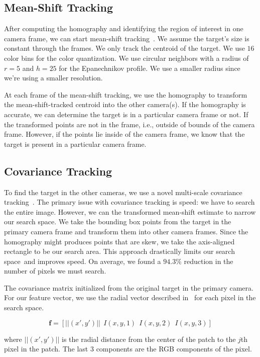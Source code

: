 \documentclass{article}
\begin{document}
\subsection{Mean-Shift Tracking}
\label{sec:meanshift}
After computing the homography and identifying the region of interest in one camera frame, we can start mean-shift tracking~\cite{comaniciu2003kernel}. We assume the target's size is constant through the frames. We only track the centroid of the target. We use $16$ color bins for the color quantization. We use circular neighbors with a radius of $r=5$ and $h=25$ for the Epanechnikov profile. We use a smaller radius since we're using a smaller resolution.

At each frame of the mean-shift tracking, we use the homography to transform the mean-shift-tracked centroid into the other camera(s). If the homography is accurate, we can determine the target is in a particular camera frame or not. If the transformed points are not in the frame, i.e., outside of bounds of the camera frame. However, if the points lie inside of the camera frame, we know that the target is present in a particular camera frame.

\subsection{Covariance Tracking}
\label{sec:covariance}
To find the target in the other cameras, we use a novel multi-scale covariance tracking~\cite{porikli2006covariance}. The primary issue with covariance tracking is speed: we have to search the entire image. However, we can the transformed mean-shift estimate to narrow our search space. We take the bounding box points from the target in the primary camera frame and transform them into other camera frames. Since the homography might produces points that are skew, we take the axis-aligned rectangle to be our search area. This approach drastically limits our search space and improves speed. On average, we found a $94.3\%$ reduction in the number of pixels we must search.

The covariance matrix initialized from the original target in the primary camera. For our feature vector, we use the radial vector described in~\cite{porikli2006covariance} for each pixel in the search space.

\[
\mathbf{f} = \left[ ||(x', y')||~~I(x,y,1)~~I(x,y,2)~~I(x,y,3)\right]
\]

where $||(x', y')||$ is the radial distance from the center of the patch to the $j$th pixel in the patch. The last $3$ components are the RGB components of the pixel.
\end{document}
